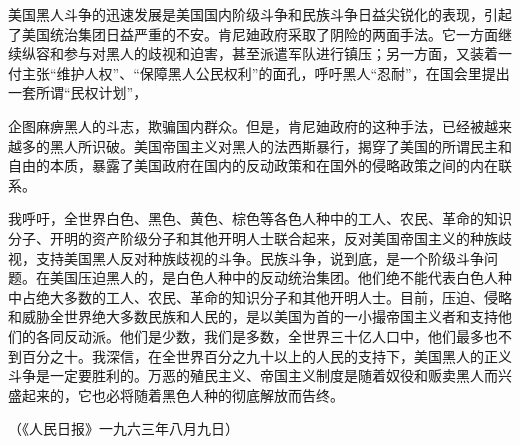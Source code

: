 美国黑人斗争的迅速发展是美国国内阶级斗争和民族斗争日益尖锐化的表现，引起了美国统治集团日益严重的不安。肯尼廸政府采取了阴险的两面手法。它一方面继续纵容和参与对黑人的歧视和迫害，甚至派遣军队进行镇压；另一方面，又装着一付主张“维护人权”、“保障黑人公民权利”的面孔，呼吁黑人“忍耐”，在国会里提出一套所谓“民权计划”，

企图麻痹黑人的斗志，欺骗国内群众。但是，肯尼廸政府的这种手法，已经被越来越多的黑人所识破。美国帝国主义对黑人的法西斯暴行，揭穿了美国的所谓民主和自由的本质，暴露了美国政府在国内的反动政策和在国外的侵略政策之间的内在联系。

我呼吁，全世界白色、黑色、黄色、棕色等各色人种中的工人、农民、革命的知识分子、开明的资产阶级分子和其他开明人士联合起来，反对美国帝国主义的种族歧视，支持美国黑人反对种族歧视的斗争。民族斗争，说到底，是一个阶级斗争问题。在美国压迫黑人的，是白色人种中的反动统治集团。他们绝不能代表白色人种中占绝大多数的工人、农民、革命的知识分子和其他开明人士。目前，压迫、侵略和威胁全世界绝大多数民族和人民的，是以美国为首的一小撮帝国主义者和支持他们的各同反动派。他们是少数，我们是多数，全世界三十亿人口中，他们最多也不到百分之十。我深信，在全世界百分之九十以上的人民的支持下，美国黑人的正义斗争是一定要胜利的。万恶的殖民主义、帝国主义制度是随着奴役和贩卖黑人而兴盛起来的，它也必将随着黑色人种的彻底解放而告终。

{\raggedleft （《人民日报》一九六三年八月九日）\par}


